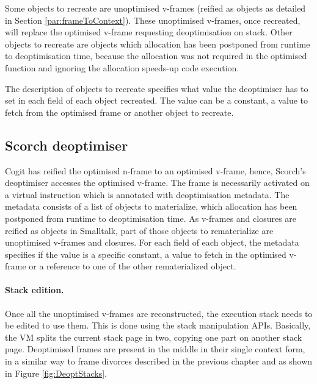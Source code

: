 \documentclass[a4paper,12pt,twoside]{../includes/ThesisStyle}
\begin{document}
Some objects to recreate are unoptimised v-frames (reified as objects as detailed in Section \ref{par:frameToContext}). These unoptimised v-frames, once recreated, will replace the optimised v-frame requesting deoptimisation on stack. Other objects to recreate are objects which allocation has been postponed from runtime to deoptimisation time, because the allocation was not required in the optimised function and ignoring the allocation speeds-up code execution. 

The description of objects to recreate specifies what value the deoptimiser has to set in each field of each object recreated. The value can be a constant, a value to fetch from the optimised frame or another object to recreate.

\subsection{Scorch deoptimiser}

Cogit has reified the optimised n-frame to an optimised v-frame, hence, Scorch's deoptimiser accesses the optimised v-frame. The frame is necessarily activated on a virtual instruction which is annotated with deoptimisation metadata. The metadata consists of a list of objects to materialize, which allocation has been postponed from runtime to deoptimisation time. As v-frames and closures are reified as objects in Smalltalk, part of those objects to rematerialize are unoptimised v-frames and closures. For each field of each object, the metadata specifies if the value is a specific constant, a value to fetch in the optimised v-frame or a reference to one of the other rematerialized object.

\paragraph{Stack edition.}

Once all the unoptimised v-frames are reconstructed, the execution stack needs to be edited to use them. This is done using the stack manipulation APIs. Basically, the VM splits the current stack page in two, copying one part on another stack page. Deoptimised frames are present in the middle in their single context form, in a similar way to frame divorces described in the previous chapter and as shown in Figure \ref{fig:DeoptStacks}.
\end{document}
